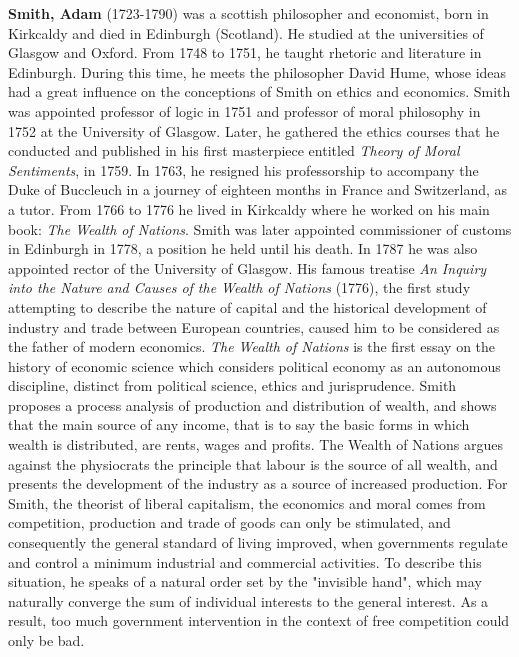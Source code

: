 \textbf{Smith, Adam} (1723-1790) was a scottish philosopher and economist, born in Kirkcaldy and died in Edinburgh (Scotland). He studied at the universities of Glasgow and Oxford. From 1748 to 1751, he taught rhetoric and literature in Edinburgh. During this time, he meets the philosopher David Hume, whose ideas had a great influence on the conceptions of Smith on ethics and economics. Smith was appointed professor of logic in 1751 and professor of moral philosophy in 1752 at the University of Glasgow. Later, he gathered the ethics courses that he conducted and published in his first masterpiece entitled \textit{Theory of Moral Sentiments}, in 1759. In 1763, he resigned his professorship to accompany the Duke of Buccleuch in a journey of eighteen months in France and Switzerland, as a tutor. From 1766 to 1776 he lived in Kirkcaldy where he worked on his main book: \textit{The Wealth of Nations}. Smith was later appointed commissioner of customs in Edinburgh in 1778, a position he held until his death. In 1787 he was also appointed rector of the University of Glasgow. His famous treatise\textit{ An Inquiry into the Nature and Causes of the Wealth of Nations} (1776), the first study attempting to describe the nature of capital and the historical development of industry and trade between European countries, caused him to be considered as the father of modern economics. \textit{The Wealth of Nations} is the first essay on the history of economic science which considers political economy as an autonomous discipline, distinct from political science, ethics and jurisprudence. Smith proposes a process analysis of production and distribution of wealth, and shows that the main source of any income, that is to say the basic forms in which wealth is distributed, are rents, wages and profits. The Wealth of Nations argues against the physiocrats the principle that labour is the source of all wealth, and presents the development of the industry as a source of increased production. For Smith, the theorist of liberal capitalism, the economics and moral comes from competition, production and trade of goods can only be stimulated, and consequently the general standard of living improved, when governments regulate and control a minimum industrial and commercial activities. To describe this situation, he speaks of a natural order set by the "invisible hand", which may naturally converge the sum of individual interests to the general interest. As a result, too much government intervention in the context of free competition could only be bad.

